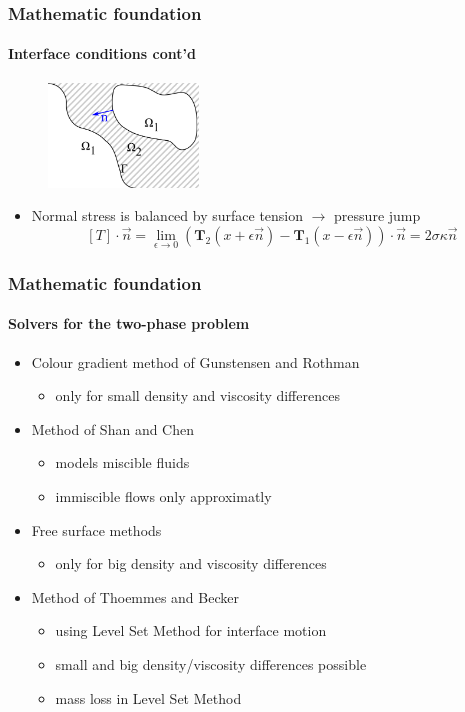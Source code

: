 \documentclass[ucs]{beamer}
\begin{document}
\begin{frame}
\frametitle{Mathematic foundation}
\framesubtitle{Interface conditions cont'd}
\vspace{-.5cm}
\begin{figure}[h!]
\includegraphics[width=4cm]{skizze.png}
\end{figure}
\vspace{-.5cm}
\begin{itemize}
\item<1->Normal stress is balanced by surface tension $\rightarrow$ pressure jump
  $$[T] \cdot \vec n= \lim_{\epsilon \to 0}(\textbf{T}_2(x+\epsilon \vec n) - \textbf{T}_1(x-\epsilon \vec n)) \cdot \vec n= 2\sigma \kappa \vec n$$
\end{itemize}
\vspace{-.5cm}
\end{frame}

\begin{frame}
\frametitle{Mathematic foundation}
\framesubtitle{Solvers for the two-phase problem}
\begin{itemize}
\item<1-> Colour gradient method of Gunstensen and Rothman
\begin{itemize}
\item only for small density and viscosity differences
\end{itemize}
\item<2-> Method of Shan and Chen
\begin{itemize}
\item models miscible fluids
\item immiscible flows only approximatly
\end{itemize}
\item<3-> Free surface methods
\begin{itemize}
\item only for big density and viscosity differences
\end{itemize}
\item<4-> Method of Thoemmes and Becker
\begin{itemize}
\item using Level Set Method for interface motion
\item small and big density/viscosity differences possible
\item mass loss in Level Set Method
\end{itemize}
\end{itemize}
\end{frame}
\end{document}
